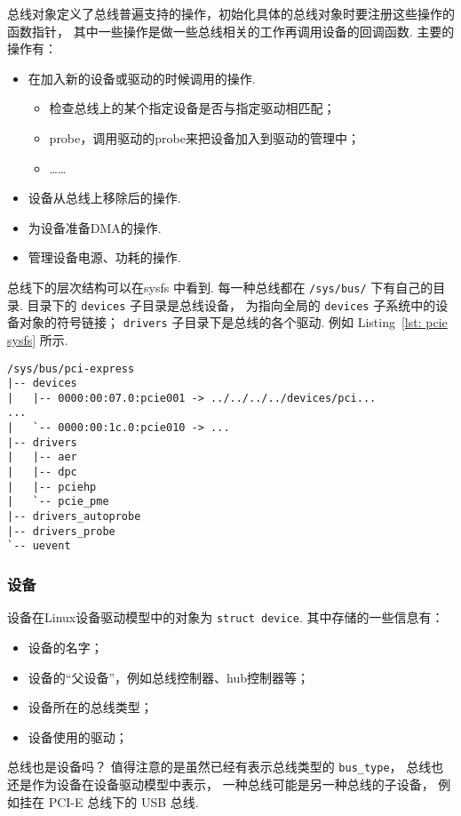 总线对象定义了总线普遍支持的操作，初始化具体的总线对象时要注册这些操作的函数指针，
其中一些操作是做一些总线相关的工作再调用设备的回调函数.
主要的操作有：
\begin{itemize}
	\item 在加入新的设备或驱动的时候调用的操作.
	      \begin{itemize}
		      \item 检查总线上的某个指定设备是否与指定驱动相匹配；
		      \item probe，调用驱动的probe来把设备加入到驱动的管理中；
		      \item ……
	      \end{itemize}
	\item 设备从总线上移除后的操作.
	\item 为设备准备DMA的操作.
	\item 管理设备电源、功耗的操作.
\end{itemize}

总线下的层次结构可以在sysfs 中看到.
每一种总线都在 \lstinline{/sys/bus/} 下有自己的目录.
目录下的 \lstinline{devices} 子目录是总线设备，
为指向全局的 \lstinline{devices} 子系统中的设备对象的符号链接；
\lstinline{drivers} 子目录下是总线的各个驱动.
例如 Listing~\ref{lst: pcie sysfs} 所示.

\begin{lstlisting}[caption={PCIE总线在sysfs中的结构}, label={lst: pcie sysfs}]
/sys/bus/pci-express
|-- devices
|   |-- 0000:00:07.0:pcie001 -> ../../../../devices/pci...
...
|   `-- 0000:00:1c.0:pcie010 -> ...
|-- drivers
|   |-- aer
|   |-- dpc
|   |-- pciehp
|   `-- pcie_pme
|-- drivers_autoprobe
|-- drivers_probe
`-- uevent
\end{lstlisting}

\subsubsection{设备}
设备在Linux设备驱动模型中的对象为 \lstinline{struct device}.
其中存储的一些信息有：
\begin{itemize}
	\item 设备的名字；
	\item 设备的“父设备”，例如总线控制器、hub控制器等；
	\item 设备所在的总线类型；
	\item 设备使用的驱动；
\end{itemize}

\begin{qbox}{总线也是设备吗？}
	值得注意的是虽然已经有表示总线类型的 \lstinline{bus_type}，
	总线也还是作为设备在设备驱动模型中表示，
	一种总线可能是另一种总线的子设备，
	例如挂在 PCI-E 总线下的 USB 总线.
\end{qbox}

